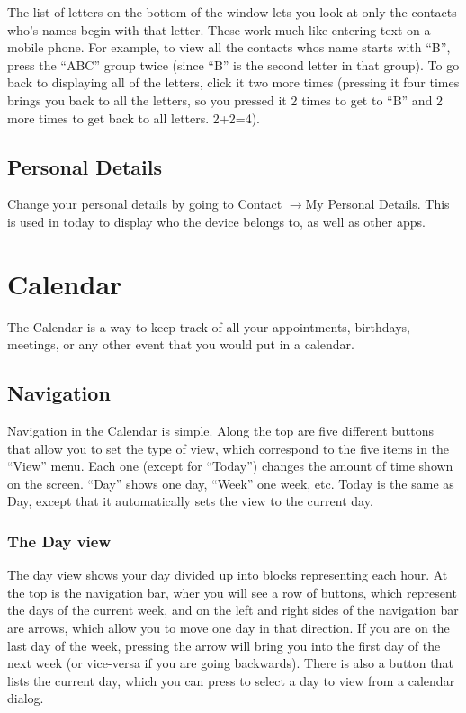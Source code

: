 \documentclass[12pt,letterpaper,oneside, openany]{book} \usepackage[latin1] {inputenc}
\begin{document}
The list of letters on the bottom of the window lets you look at only the contacts who's names begin with that letter. These work much like entering text on a mobile phone. For example, to view all the contacts whos name starts with ``B'', press the ``ABC'' group twice (since ``B'' is the second letter in that group). To go back to displaying all of the letters, click it two more times (pressing it four times brings you back to all the letters, so you pressed it 2 times to get to ``B'' and 2 more times to get back to all letters. 2+2=4). 

\section{Personal Details}

Change your personal details by going to Contact \begin{math}\rightarrow\end{math}My Personal Details. This is used in today to display who the device belongs to, as well as other apps.

\chapter{Calendar}
The Calendar is a way to keep track of all your appointments, birthdays, meetings, or any other event that you would put in a calendar.

\section{Navigation}

Navigation in the Calendar is simple.  Along the top are five different buttons that allow you to set the type of view, which correspond to the five items in the ``View'' menu. Each one (except for ``Today'') changes the amount of time shown on the screen. ``Day'' shows one day, ``Week'' one week, etc. Today is the same as Day, except that it automatically sets the view to the current day. 

\subsection{The Day view}

The day view shows your day divided up into blocks representing each hour. At the top is the navigation bar, wher you will see a row of buttons, which represent the days of the current week, and on the left and right sides of the navigation bar are arrows, which allow you to move one day in that direction. If you are on the last day of the week, pressing the arrow will bring you into the first day of the next week (or vice-versa if you are going backwards). There is also a button that lists the current day, which you can press to select a day to view from a calendar dialog. 
\end{document}
